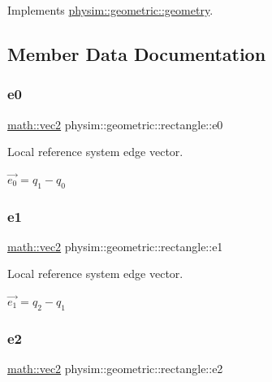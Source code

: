 Implements \hyperlink{classphysim_1_1geometric_1_1geometry_a11c26d2fea85bf7bc41ec94cefa9729e}{physim\+::geometric\+::geometry}.



\subsection{Member Data Documentation}
\mbox{\label{classphysim_1_1geometric_1_1rectangle_a70d4839212717247ae294f94cd7de372}} 
\subsubsection{\texorpdfstring{e0}{e0}}
{\footnotesize\ttfamily \hyperlink{structphysim_1_1math_1_1vec2}{math\+::vec2} physim\+::geometric\+::rectangle\+::e0\hspace{0.3cm}{\ttfamily [private]}}



Local reference system edge vector. 

$\vec{e_0} = q_1 - q_0$ \mbox{\label{classphysim_1_1geometric_1_1rectangle_a511c131352fa83a64f3f30935ae87be7}} 
\subsubsection{\texorpdfstring{e1}{e1}}
{\footnotesize\ttfamily \hyperlink{structphysim_1_1math_1_1vec2}{math\+::vec2} physim\+::geometric\+::rectangle\+::e1\hspace{0.3cm}{\ttfamily [private]}}



Local reference system edge vector. 

$\vec{e_1} = q_2 - q_1$ \mbox{\label{classphysim_1_1geometric_1_1rectangle_a7d4880bb512b054f354393df0309c2b8}} 
\subsubsection{\texorpdfstring{e2}{e2}}
{\footnotesize\ttfamily \hyperlink{structphysim_1_1math_1_1vec2}{math\+::vec2} physim\+::geometric\+::rectangle\+::e2\hspace{0.3cm}{\ttfamily [private]}}




